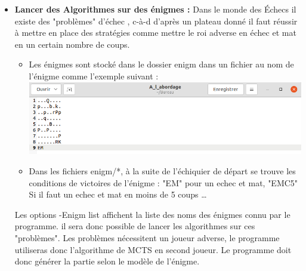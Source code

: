 \documentclass{article}
\begin{document}
\begin{itemize}
    \item \textbf{Lancer des Algorithmes sur des énigmes : }
    \newline
        Dans le monde des Échecs il existe des "problèmes" d'échec \cite{Krt}, c-à-d d'après un plateau donné il faut réussir à mettre en place des stratégies comme mettre le roi adverse en échec et mat en un certain nombre de coups.\newline
        \begin{itemize}
            \item Les énigmes sont stocké dans le dossier enigm dans un fichier au nom de l'énigme comme l'exemple suivant : \newline
            \includegraphics[scale = 0.3]{img/a_l_abordage.png}
            \item Dans les fichiers enigm/*, à la suite de l'échiquier de départ se trouve les conditions de victoires de l'énigme : "EM" pour un echec et mat, "EMC5" Si il faut un echec et mat en moins de 5 coups \dots
        \end{itemize}
        Les options -Enigm list affichent la liste des noms des énigmes connu par le programme.
        il sera donc possible de lancer les algorithmes sur ces "problèmes".
        Les problèmes nécessitent un joueur adverse, le programme utiliseras donc l'algorithme de MCTS en second joueur.
        Le programme doit donc générer la partie selon le modèle de l'énigme.
\end{itemize}
\end{document}
